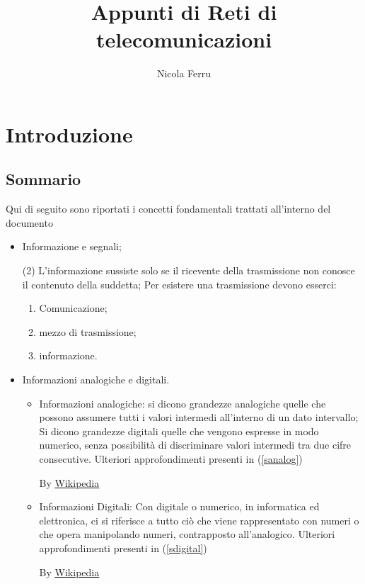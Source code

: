 \documentclass{book}
\title{Appunti di Reti di telecomunicazioni}
\author{Nicola Ferru}
\date{}
\begin{document}
\maketitle
\tableofcontents
\listoftables
\listoffigures
\chapter{Introduzione}
\section{Sommario}
Qui di seguito sono riportati i concetti fondamentali trattati all'interno
del documento
\begin{itemize}
	\item Informazione e segnali;
		\begin{tasks}(2)
			\task L'informazione sussiste solo se il ricevente della
			trasmissione non conosce il contenuto della suddetta;
			\task Per esistere una trasmissione devono esserci:
				\begin{enumerate}
					\item Comunicazione;
					\item mezzo di trasmissione;
					\item informazione.
				\end{enumerate}
		\end{tasks}
	\item Informazioni analogiche e digitali.
		\begin{itemize}
			\item Informazioni analogiche: si dicono grandezze analogiche
				quelle che possono assumere tutti i valori intermedi
				all'interno di un dato intervallo; Si dicono grandezze digitali
				quelle che vengono espresse in modo numerico, senza possibilità
				di discriminare valori intermedi tra due cifre consecutive. 
				Ulteriori approfondimenti presenti in (\ref{sanalog})
				\begin{center}
					By
					\underline{\href{https://it.wikipedia.org/wiki/Analogico}{Wikipedia}}
				\end{center}
			\item Informazioni Digitali: Con digitale o numerico, in 
				informatica ed elettronica, ci si riferisce a tutto ciò che
				viene rappresentato con numeri o che opera manipolando numeri,
				contrapposto all'analogico. Ulteriori approfondimenti presenti
				in (\ref{sdigital})
				\begin{center}
					By \underline{\href{https://it.wikipedia.org/wiki/Digitale_(informatica)}{Wikipedia}}
				\end{center}
		\end{itemize}
\end{itemize}
\end{document}

